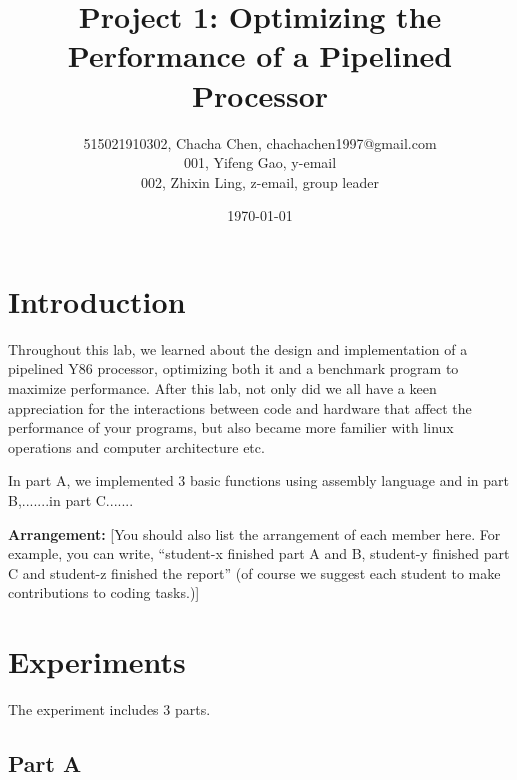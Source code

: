 \documentclass{article}
\title{\textbf{Project 1: Optimizing the Performance of a Pipelined Processor}} %
\author{515021910302, Chacha Chen, chachachen1997@gmail.com \\
        001, Yifeng Gao, y-email \\
        002, Zhixin Ling, z-email, group leader } %
\date{\today} %
\begin{document}
\maketitle %

\section{Introduction}

Throughout this lab, we learned about the design and implementation of a pipelined Y86 processor, optimizing both it and a benchmark program to maximize performance. After this lab, not only did we all have a keen appreciation for the interactions between code and hardware that affect the performance of your programs, but also became more familier with linux operations and computer architecture etc.

In part A, we implemented 3 basic functions using assembly language and in part B,.......in part C.......

\noindent\textbf{Arrangement:}
[You should also list the arrangement of each member here. For example, you can write, “student-x finished part A and B, student-y finished part C and student-z finished the report” (of course we suggest each student to make contributions to coding tasks.)]


\section{Experiments}
The experiment includes 3 parts.

\subsection{Part A}
\end{document}
